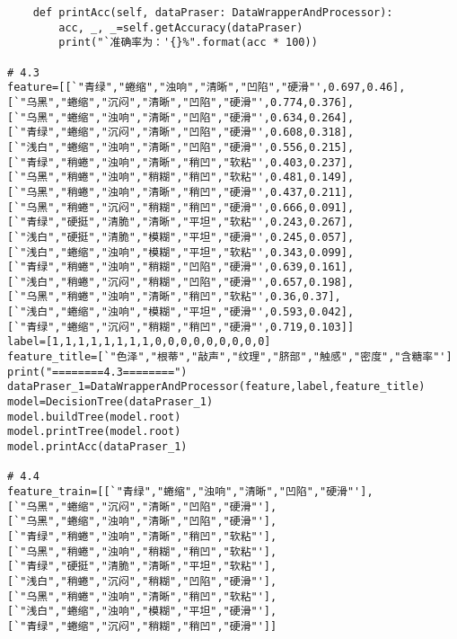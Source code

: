 \documentclass{ctexart}
\begin{document}
\begin{lstlisting}
    def printAcc(self, dataPraser: DataWrapperAndProcessor):
        acc, _, _=self.getAccuracy(dataPraser)
        print("`准确率为：'{}%".format(acc * 100))

# 4.3
feature=[[`"青绿","蜷缩","浊响","清晰","凹陷","硬滑"',0.697,0.46],
[`"乌黑","蜷缩","沉闷","清晰","凹陷","硬滑"',0.774,0.376],
[`"乌黑","蜷缩","浊响","清晰","凹陷","硬滑"',0.634,0.264],
[`"青绿","蜷缩","沉闷","清晰","凹陷","硬滑"',0.608,0.318],
[`"浅白","蜷缩","浊响","清晰","凹陷","硬滑"',0.556,0.215],
[`"青绿","稍蜷","浊响","清晰","稍凹","软粘"',0.403,0.237],
[`"乌黑","稍蜷","浊响","稍糊","稍凹","软粘"',0.481,0.149],
[`"乌黑","稍蜷","浊响","清晰","稍凹","硬滑"',0.437,0.211],
[`"乌黑","稍蜷","沉闷","稍糊","稍凹","硬滑"',0.666,0.091],
[`"青绿","硬挺","清脆","清晰","平坦","软粘"',0.243,0.267],
[`"浅白","硬挺","清脆","模糊","平坦","硬滑"',0.245,0.057],
[`"浅白","蜷缩","浊响","模糊","平坦","软粘"',0.343,0.099],
[`"青绿","稍蜷","浊响","稍糊","凹陷","硬滑"',0.639,0.161],
[`"浅白","稍蜷","沉闷","稍糊","凹陷","硬滑"',0.657,0.198],
[`"乌黑","稍蜷","浊响","清晰","稍凹","软粘"',0.36,0.37],
[`"浅白","蜷缩","浊响","模糊","平坦","硬滑"',0.593,0.042],
[`"青绿","蜷缩","沉闷","稍糊","稍凹","硬滑"',0.719,0.103]]
label=[1,1,1,1,1,1,1,1,0,0,0,0,0,0,0,0,0]
feature_title=[`"色泽","根蒂","敲声","纹理","脐部","触感","密度","含糖率"']
print("========4.3========")
dataPraser_1=DataWrapperAndProcessor(feature,label,feature_title)
model=DecisionTree(dataPraser_1)
model.buildTree(model.root)
model.printTree(model.root)
model.printAcc(dataPraser_1)

# 4.4
feature_train=[[`"青绿","蜷缩","浊响","清晰","凹陷","硬滑"'],
[`"乌黑","蜷缩","沉闷","清晰","凹陷","硬滑"'],
[`"乌黑","蜷缩","浊响","清晰","凹陷","硬滑"'],
[`"青绿","稍蜷","浊响","清晰","稍凹","软粘"'],
[`"乌黑","稍蜷","浊响","稍糊","稍凹","软粘"'],
[`"青绿","硬挺","清脆","清晰","平坦","软粘"'],
[`"浅白","稍蜷","沉闷","稍糊","凹陷","硬滑"'],
[`"乌黑","稍蜷","浊响","清晰","稍凹","软粘"'],
[`"浅白","蜷缩","浊响","模糊","平坦","硬滑"'],
[`"青绿","蜷缩","沉闷","稍糊","稍凹","硬滑"']]


\end{lstlisting}
\end{document}

